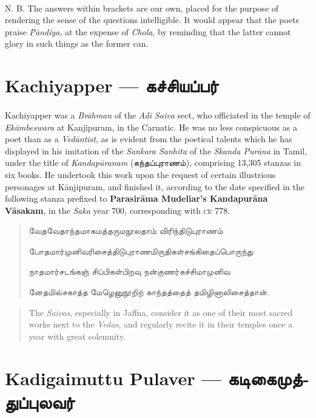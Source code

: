 \documentclass{article}
\newcommand{\TamilText}[1]{\texttamil{#1}}
\newcommand{\TamilBold}[1]{\texttamil{\textbf{#1}}}
\newcommand{\tam}[1]{\TamilText{#1}}
\newcommand{\tambold}[1]{\TamilBold{#1}}
\begin{document}
\paragraph{}
N. B. The answers within brackets are our own, placed for the purpose of rendering the sense of the questions intelligible. It would appear that the poets praise \emph{P\={a}ndiya}, at the expense of \emph{Chola}, by reminding that the latter cannot glory in such things as the former can.

\section{Kachiyapper --- \tambold{கச்சியப்பர்}}
\paragraph{}
Kachiyapper was a \emph{Br\={a}hman} of the \emph{Adi Saiva} sect, who officiated in the temple of \emph{Ek\={a}mbeswara} at Kanjipuram, in the Carnatic. He was no less conspicuous as a poet than as a \emph{Ved\={a}ntist}, as is evident from the poetical talents which he has displayed in his imitation of the \emph{Sankara Sanhita} of the \emph{Skanda Pur\={a}na} in Tamil, under the title of \emph{Kandap\={u}ranam} (\tam{கந்தப்புராணம்}), comprising 13,305 stanzas in six books. He undertook this work upon the request of certain illustrious personages at K\={a}njipuram, and finished it, according to the date specified in the following stanza prefixed to \textbf{Parasir\={a}ma Mudeliar's Kandapur\={a}na V\={a}sakam}, in the \emph{Saka} year 700, corresponding with \textsc{ce} 778.
\begin{quotation}\small
\tam{வேதவேதாந்தமாகமத்தருமநூலதாம்‌ விரிந்திடுபுராணம்‌}

\tam{போதமார்முனிவரிசைத்திடுபுராணமிருதிகள்சங்கிதைப்பொருந்து}

\tam{நாதமார்சடங்கஞ்‌ சிப்பிகள்பிறவு நன்குணர்கச்சிமாமுனிவ}

\tam{னேதமில்சகாத்த மேழெனுநூறிற்‌ காந்தத்தைத் தமிழினாலிசைத்தான்‌}.
\end{quotation}
\begin{quotation}\small
The \emph{Saivas}, especially in Jaffna, consider it as one of their most sacred works next to the \emph{Vedas}, and regularly recite it in their temples once a year with great solemnity.
\end{quotation}

\section{Kadigaimuttu Pulaver --- \tambold{கடிகைமுத்துப்புலவர்}}
\end{document}
